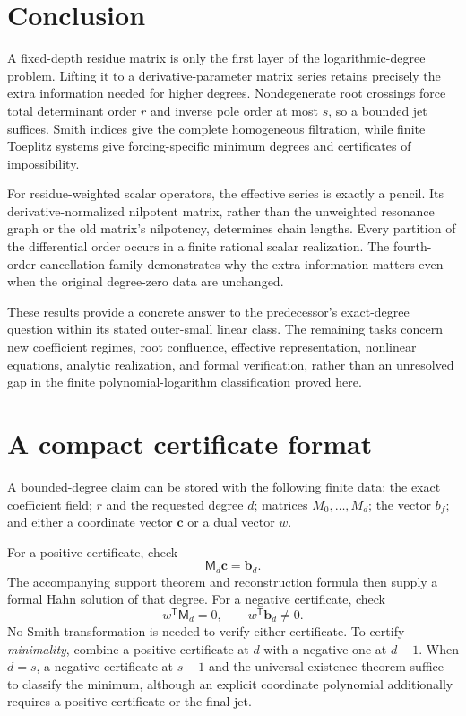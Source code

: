 \documentclass[11pt,a4paper]{article}
\numberwithin{equation}{section}
\theoremstyle{definition}
\theoremstyle{remark}
\theoremstyle{definition}
\newcommand{\Tmat}{\mathsf M}
\begin{document}
\section{Conclusion}
A fixed-depth residue matrix is only the first layer of the logarithmic-degree problem. Lifting it to a derivative-parameter matrix series retains precisely the extra information needed for higher degrees. Nondegenerate root crossings force total determinant order $r$ and inverse pole order at most $s$, so a bounded jet suffices. Smith indices give the complete homogeneous filtration, while finite Toeplitz systems give forcing-specific minimum degrees and certificates of impossibility.

For residue-weighted scalar operators, the effective series is exactly a pencil. Its derivative-normalized nilpotent matrix, rather than the unweighted resonance graph or the old matrix's nilpotency, determines chain lengths. Every partition of the differential order occurs in a finite rational scalar realization. The fourth-order cancellation family demonstrates why the extra information matters even when the original degree-zero data are unchanged.

These results provide a concrete answer to the predecessor's exact-degree question within its stated outer-small linear class. The remaining tasks concern new coefficient regimes, root confluence, effective representation, nonlinear equations, analytic realization, and formal verification, rather than an unresolved gap in the finite polynomial-logarithm classification proved here.

\appendix
\section{A compact certificate format}
\label{app:certificate}
A bounded-degree claim can be stored with the following finite data: the exact coefficient field; $r$ and the requested degree $d$; matrices $M_0,\ldots,M_d$; the vector $b_f$; and either a coordinate vector $\mathbf c$ or a dual vector $w$.

For a positive certificate, check
\[
 \Tmat_d\mathbf c=\mathbf b_d.
\]
The accompanying support theorem and reconstruction formula then supply a formal Hahn solution of that degree. For a negative certificate, check
\[
 w^{\mathsf T}\Tmat_d=0,\qquad
 w^{\mathsf T}\mathbf b_d\ne0.
\]
No Smith transformation is needed to verify either certificate. To certify \emph{minimality}, combine a positive certificate at $d$ with a negative one at $d-1$. When $d=s$, a negative certificate at $s-1$ and the universal existence theorem suffice to classify the minimum, although an explicit coordinate polynomial additionally requires a positive certificate or the final jet.
\end{document}
